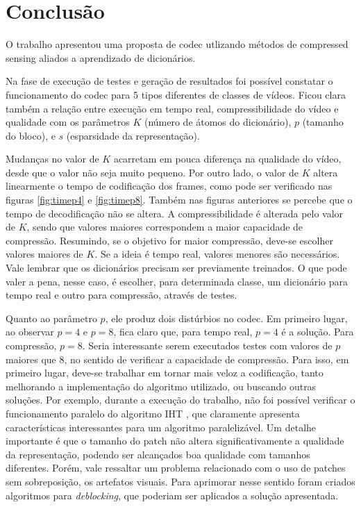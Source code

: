 \documentclass[cic,tc]{iiufrgs}
\begin{document}
\chapter{Conclusão}
O trabalho apresentou uma proposta de codec utlizando métodos de compressed sensing
aliados a aprendizado de dicionários. 

Na fase de execução de testes e geração de resultados foi possível constatar o funcionamento 
do codec para 5 tipos diferentes de classes de vídeos.
Ficou clara também a relação entre execução em tempo real, compressibilidade do vídeo e 
qualidade com os parâmetros $K$ (número de átomos do dicionário), $p$ (tamanho do bloco), 
e $s$ (esparsidade da representação).

Mudanças no valor de $K$ acarretam em pouca diferença na qualidade do vídeo, desde que 
o valor não seja muito pequeno. 
Por outro lado, o valor de $K$ altera linearmente o tempo de codificação dos frames, como 
pode ser verificado nas figuras \ref{fig:timep4} e \ref{fig:timep8}.
Também nas figuras anteriores se percebe que o tempo de decodificação não se altera.
A compressibilidade é alterada pelo valor de $K$, sendo que valores maiores correspondem 
a maior capacidade de compressão.
Resumindo, se o objetivo for maior compressão, deve-se escolher valores maiores de $K$.
Se a ideia é tempo real, valores menores são necessários.
Vale lembrar que os dicionários precisam ser previamente treinados. 
O que pode valer a pena, nesse caso, é escolher, para determinada classe, um dicionário para 
tempo real e outro para compressão, através de testes.

Quanto ao parâmetro $p$, ele produz dois distúrbios no codec.
Em primeiro lugar, ao observar $p=4$ e $p=8$, fica claro que, para tempo real, $p=4$ é a 
solução. Para compressão, $p=8$. 
Seria interessante serem executados testes com valores de $p$ maiores que $8$, 
no sentido de verificar a capacidade de compressão.
Para isso, em primeiro lugar, deve-se trabalhar em tornar mais veloz a codificação, tanto 
melhorando a implementação do algoritmo utilizado, ou buscando outras soluções.
Por exemplo, durante a execução do trabalho, não foi possível verificar o funcionamento 
paralelo do algoritmo IHT \cite{BLUMENSATHIHT}, que claramente apresenta características
interessantes para um algoritmo paralelizável.
Um detalhe importante é que o tamanho do patch não altera significativamente a qualidade 
da representação, podendo ser alcançados boa qualidade com tamanhos diferentes. 
Porém, vale ressaltar um problema relacionado com o uso de patches sem sobreposição, os 
artefatos visuais. 
Para aprimorar nesse sentido foram criados algoritmos para \emph{deblocking}, que poderiam 
ser aplicados a solução apresentada.
\end{document}
